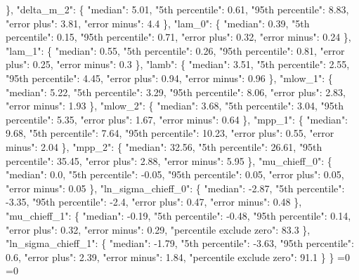 {{      \}, %
      "delta\_m\_2": \{%
        "median": 5.01, %
        "5th percentile": 0.61, %
        "95th percentile": 8.83, %
        "error plus": 3.81, %
        "error minus": 4.4%
      \}, %
      "lam\_0": \{%
        "median": 0.39, %
        "5th percentile": 0.15, %
        "95th percentile": 0.71, %
        "error plus": 0.32, %
        "error minus": 0.24%
      \}, %
      "lam\_1": \{%
        "median": 0.55, %
        "5th percentile": 0.26, %
        "95th percentile": 0.81, %
        "error plus": 0.25, %
        "error minus": 0.3%
      \}, %
      "lamb": \{%
        "median": 3.51, %
        "5th percentile": 2.55, %
        "95th percentile": 4.45, %
        "error plus": 0.94, %
        "error minus": 0.96%
      \}, %
      "mlow\_1": \{%
        "median": 5.22, %
        "5th percentile": 3.29, %
        "95th percentile": 8.06, %
        "error plus": 2.83, %
        "error minus": 1.93%
      \}, %
      "mlow\_2": \{%
        "median": 3.68, %
        "5th percentile": 3.04, %
        "95th percentile": 5.35, %
        "error plus": 1.67, %
        "error minus": 0.64%
      \}, %
      "mpp\_1": \{%
        "median": 9.68, %
        "5th percentile": 7.64, %
        "95th percentile": 10.23, %
        "error plus": 0.55, %
        "error minus": 2.04%
      \}, %
      "mpp\_2": \{%
        "median": 32.56, %
        "5th percentile": 26.61, %
        "95th percentile": 35.45, %
        "error plus": 2.88, %
        "error minus": 5.95%
      \}, %
      "mu\_chieff\_0": \{%
        "median": 0.0, %
        "5th percentile": {-}0.05, %
        "95th percentile": 0.05, %
        "error plus": 0.05, %
        "error minus": 0.05%
      \}, %
      "ln\_sigma\_chieff\_0": \{%
        "median": {-}2.87, %
        "5th percentile": {-}3.35, %
        "95th percentile": {-}2.4, %
        "error plus": 0.47, %
        "error minus": 0.48%
      \}, %
      "mu\_chieff\_1": \{%
        "median": {-}0.19, %
        "5th percentile": {-}0.48, %
        "95th percentile": 0.14, %
        "error plus": 0.32, %
        "error minus": 0.29, %
        "percentile exclude zero": 83.3%
      \}, %
      "ln\_sigma\_chieff\_1": \{%
        "median": {-}1.79, %
        "5th percentile": {-}3.63, %
        "95th percentile": 0.6, %
        "error plus": 2.39, %
        "error minus": 1.84, %
        "percentile exclude zero": 91.1%
      \}%
    \}}%
  \else%
    \ifnum{}=0%
      \let\qchieffLinearCorrelationModel@I@out\qchieffLinearCorrelationModel@III%
    \else%
      \ifnum{}=0%
      \let\qchieffLinearCorrelationModel@I@out\qchieffLinearCorrelationModel@IV%
}

